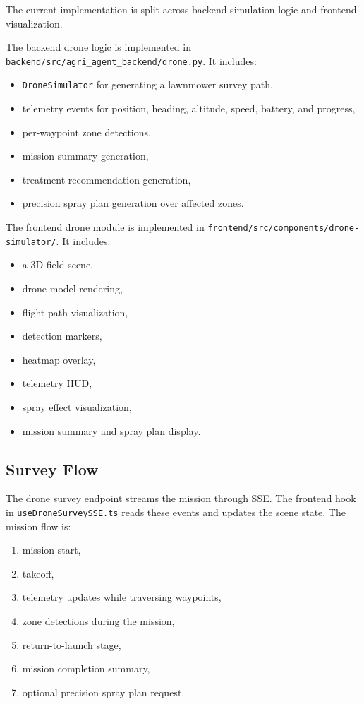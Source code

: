 \documentclass[11pt,a4paper]{article}
\begin{document}
The current implementation is split across backend simulation logic and frontend visualization.

The backend drone logic is implemented in \texttt{backend/src/agri\_agent\_backend/drone.py}. It includes:

\begin{itemize}
  \item \texttt{DroneSimulator} for generating a lawnmower survey path,
  \item telemetry events for position, heading, altitude, speed, battery, and progress,
  \item per-waypoint zone detections,
  \item mission summary generation,
  \item treatment recommendation generation,
  \item precision spray plan generation over affected zones.
\end{itemize}

The frontend drone module is implemented in \texttt{frontend/src/components/drone-simulator/}. It includes:

\begin{itemize}
  \item a 3D field scene,
  \item drone model rendering,
  \item flight path visualization,
  \item detection markers,
  \item heatmap overlay,
  \item telemetry HUD,
  \item spray effect visualization,
  \item mission summary and spray plan display.
\end{itemize}

\subsection{Survey Flow}

The drone survey endpoint streams the mission through SSE. The frontend hook in \texttt{useDroneSurveySSE.ts} reads these events and updates the scene state. The mission flow is:

\begin{enumerate}
  \item mission start,
  \item takeoff,
  \item telemetry updates while traversing waypoints,
  \item zone detections during the mission,
  \item return-to-launch stage,
  \item mission completion summary,
  \item optional precision spray plan request.
\end{enumerate}
\end{document}
